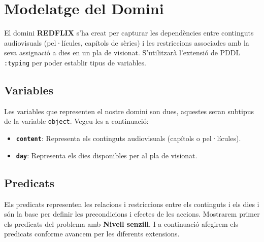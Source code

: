 \documentclass[a4paper]{article}
\begin{document}
	\newpage
	\section{Modelatge del Domini}
	
	El domini \textbf{REDFLIX} s'ha creat per capturar les dependències entre continguts audiovisuals (pel·lícules, capítols de sèries) i les restriccions associades amb la seva assignació a dies en un pla de visionat. S'utilitzarà l'extensió de PDDL \texttt{:typing} per poder establir tipus de variables.
	
	\subsection{Variables}
	
	Les variables que representen el nostre domini son dues, aquestes seran subtipus de la variable \texttt{object}. Vegeu-les a continuació:
	
	\begin{itemize}
		\item \textbf{\texttt{content}}: Representa els continguts audiovisuals (capítols o pel·lícules).
		\item \textbf{\texttt{day}}: Representa els dies disponibles per al pla de visionat.
	\end{itemize}
	
	\subsection{Predicats}
	
	Els predicats representen les relacions i restriccions entre els continguts i els dies i són la base per definir les precondicions i efectes de les accions. Mostrarem primer els predicats del problema amb \textbf{Nivell senzill}. I a continuació afegirem els predicats conforme avancem per les diferents extensions.
	
\end{document}
